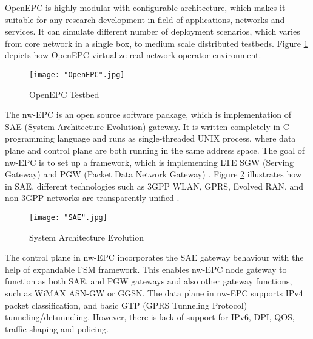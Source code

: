 OpenEPC is highly modular with configurable architecture, which makes it suitable for any research development in field of applications, networks and services. It can simulate different number of deployment scenarios, which varies from core network in a single box, to medium scale distributed testbeds. Figure \ref{fig:OpenEPC} depicts how OpenEPC virtualize real network operator environment.  

\begin{figure}[h!t]
\centering
{}
\texttt{[image: "OpenEPC".jpg]}
\caption{OpenEPC Testbed \cite{OpenEPC}}
\label{fig:OpenEPC}
\end{figure}

The nw-EPC is an open source software package, which is implementation of SAE (System Architecture Evolution) gateway. It is written completely in C programming language and runs as single-threaded UNIX process, where data plane and control plane are both running in the same address space. The goal of nw-EPC is to set up a framework, which is implementing LTE SGW (Serving Gateway) and PGW (Packet Data Network Gateway) \cite{nwEPC}. Figure \ref{fig:SAE} illustrates how in SAE, different technologies such as 3GPP WLAN, GPRS, Evolved RAN, and non-3GPP networks are transparently unified \cite{SAE}.

\begin{figure}[h!t]
\centering
{}
\texttt{[image: "SAE".jpg]}
\caption{System Architecture Evolution \cite{SAE}}
\label{fig:SAE}
\end{figure}

The control plane in nw-EPC incorporates the SAE gateway behaviour with the help of expandable FSM framework. This enables nw-EPC node gateway to function as both SAE, and PGW gateways and also other gateway functions, such as WiMAX ASN-GW or GGSN. The data plane in nw-EPC supports IPv4 packet classification, and basic GTP (GPRS Tunneling Protocol)  tunneling/detunneling. However, there is lack of support for IPv6, DPI, QOS, traffic shaping and policing.  

\clearpage

